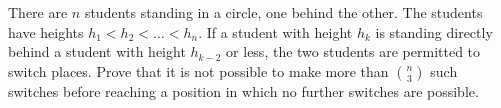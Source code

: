 There are $n$ students standing in a circle, one behind the other. The students have heights $h_1<h_2<\dots <h_n$. If a student with height $h_k$ is standing directly behind a student with height $h_{k-2}$ or less, the two students are permitted to switch places. Prove that it is not possible to make more than $\binom{n}{3}$ such switches before reaching a position in which no further switches are possible.